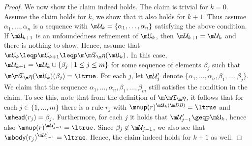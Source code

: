 \begin{proof}
We now show the claim indeed holds. 
The claim is trivial for $k=0$. Assume the claim holds for $k$, we show that it also holds for $k+1$. 
Thus assume $\alpha_1,\dots,\alpha_n$ is a sequence with $\UU_{k} = \{ \alpha_1,\dots,\alpha_n\}$ satisfying the above condition. 
If $\UUU_{k+1}$ is an unfoundedness refinement of $\UUU_k$, then $\UU_{k+1}=\UU_k$ and there is nothing to show. Hence, assume that $\UUU_k \leqp \UUU_{k+1}\leqp \Ap(\UUU_k)$. In this case, $\UU_{k+1} = \UU_k \cup \{ \beta_j\mid 1\leq j\leq m\}$ for some sequence of elements $\beta_j$ such that $\Ap(\UUU_k)(\beta_j) = \ltrue$. For each $j$, let $\UU'_j$ denote $\{\alpha_1,\dots,\alpha_n,\beta_1,\dots,\beta_j\}$. 
We claim that the sequence 
$\alpha_1,\dots,\alpha_n,\beta_1,\dots,\beta_m$ still satisfies the condition in the claim. 
To see this, note that from the definition of $\Ap$, it follows that for each $j\in \{1,\dots, m\}$ there is a rule $r_j$ with $\nup(r)^{\UUU_k(\db)}=\ltrue$ and $\head(r_j)=\beta_j$. Furthermore, for each $j$ it holds that $\UU_{j-1}' \geqp \UUU_k$, hence also $\nup(r)^{\UU_{j-1}'}=\ltrue$. Since $\beta_j\not \in \UU_{j-1}$, we also see that $\body(r_j)^{\UU_{j-1}'} = \ltrue$. Hence, the claim indeed holds for $k+1$ as well. 
% 
% 
% 
% 
% 
%  
%  
\end{proof}

